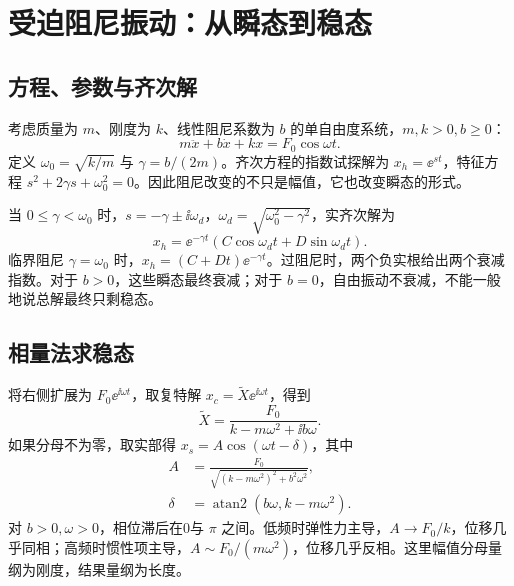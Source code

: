 \documentclass[11pt,openany,fontset=fandol]{ctexbook}
\theoremstyle{plain}\newtheorem{theorem}{定理}[chapter]\newtheorem{proposition}[theorem]{命题}
\theoremstyle{definition}\newtheorem{definition}{定义}[chapter]\newtheorem{example}{例}[chapter]
\theoremstyle{remark}\newtheorem*{remark}{说明}
\newcommand{\atan}{\operatorname{atan2}}\newcommand{\Res}{\operatorname{Res}}
\begin{document}
\section{受迫阻尼振动：从瞬态到稳态}
\subsection{方程、参数与齐次解}
考虑质量为 $m$、刚度为 $k$、线性阻尼系数为 $b$ 的单自由度系统，$m,k>0,b\ge0$：
\begin{equation}
m\ddot x+b\dot x+kx=F_0\cos\omega t.
\end{equation}
定义 $\omega_0=\sqrt{k/m}$ 与 $\gamma=b/(2m)$。齐次方程的指数试探解为 $x_h=\ee^{st}$，特征方程 $s^2+2\gamma s+\omega_0^2=0$。因此阻尼改变的不只是幅值，它也改变瞬态的形式。

当 $0\le\gamma<\omega_0$ 时，$s=-\gamma\pm\ii\omega_d$，$\omega_d=\sqrt{\omega_0^2-\gamma^2}$，实齐次解为
\begin{equation}
x_h=\ee^{-\gamma t}(C\cos\omega_dt+D\sin\omega_dt).
\end{equation}
临界阻尼 $\gamma=\omega_0$ 时，$x_h=(C+Dt)\ee^{-\gamma t}$。过阻尼时，两个负实根给出两个衰减指数。对于 $b>0$，这些瞬态最终衰减；对于 $b=0$，自由振动不衰减，不能一般地说总解最终只剩稳态。

\subsection{相量法求稳态}
将右侧扩展为 $F_0\ee^{\ii\omega t}$，取复特解 $x_c=\widetilde X\ee^{\ii\omega t}$，得到
\begin{equation}
\widetilde X=\frac{F_0}{k-m\omega^2+\ii b\omega}.
\end{equation}
如果分母不为零，取实部得 $x_s=A\cos(\omega t-\delta)$，其中
\begin{align}
A&=\frac{F_0}{\sqrt{(k-m\omega^2)^2+b^2\omega^2}},\\
\delta&=\atan(b\omega,k-m\omega^2).
\end{align}
对 $b>0,\omega>0$，相位滞后在0与 $\pi$ 之间。低频时弹性力主导，$A\to F_0/k$，位移几乎同相；高频时惯性项主导，$A\sim F_0/(m\omega^2)$，位移几乎反相。这里幅值分母量纲为刚度，结果量纲为长度。
\end{document}
